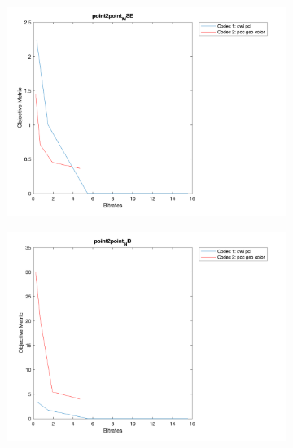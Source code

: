 \documentclass{article}
\begin{document}
\begin{figure}
    \centering
    \begin{subfigure}[b]{0.65\textwidth}
    \includegraphics[width=\textwidth]{Figures/task2/phil_p2p_mse.png}
    \end{subfigure}

    \begin{subfigure}[b]{0.65\textwidth}
    \includegraphics[width=\textwidth]{Figures/task2/phil_p2p_hd.png}
    \end{subfigure}


\end{figure}
\end{document}
